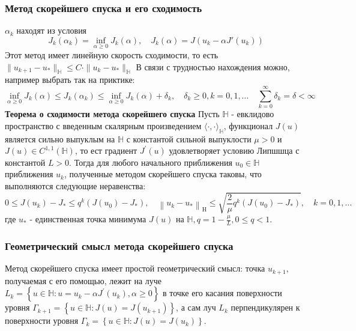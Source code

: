 \documentclass[A4]{article}
\begin{document}
\subsubsection{Метод скорейшего спуска и его сходимость}
$\alpha_k$ находят из условия 
\begin{equation*}
J_k(\alpha_k)=\inf_{\alpha\geqslant 0}J_k(\alpha),\quad J_k(\alpha)=J(u_k-\alpha J'(u_k))
\end{equation*}
Этот метод имеет линейную скорость сходимости, то есть $\|u_{k+1}-u_*\|_{\mathbb{H}} \leqslant C\cdot\|u_k-u_*\|_{\mathbb{H}}$
В связи с трудностью нахождения можно, например выбрать так на приктике:
\begin{equation*}
\inf_{\alpha\geqslant 0}J_k(\alpha)\leqslant J_k(\alpha_k)\leqslant \inf_{\alpha\geqslant 0}J_k(\alpha)+\delta_k,\quad \delta_k\geqslant 0,k=0,1,\ldots\quad \sum_{k=0}^{\infty}\delta_k=\delta<\infty
\end{equation*}
\textbf{Теорема о сходимости метода скорейшего спуска}  Пусть $\mathbb{H}$ -  евклидово пространство с введенным скалярным произведением $ \langle\cdot, \cdot\rangle_{\mathbb{H}}$, функционал $ J(u)$ является сильно выпуклым на $ \mathbb{H} $ с константой сильной выпуклости $ \mu>0 $ и $ J(u) \in C^{1,1}(\mathbb{H})$, то ест градиент $ J^{\prime}(u) $ удовлетворяет условию Липшшца с константой $ L>0$.  Тогда для любого начального приближения $ u_{0} \in \mathbb{H} $ приближения $ u_{k}$, полученные методом скорейшего спуска таковы, что выполняются следующие неравенства:
\begin{equation*}
0 \leqslant J\left(u_{k}\right)-J_{*} \leqslant q^{k}\left(J\left(u_{0}\right)-J_{*}\right), \quad\left\|u_{k}-u_{*}\right\|_{\mathrm{H}} \leqslant \sqrt{\frac{2}{\mu} q^{k}\left(J\left(u_{0}\right)-J_{*}\right)}, \quad k=0,1, \ldots
\end{equation*}
где $ u_{*}$ - единственная точка минимума $ J(u) $ на $ \mathbb{H}, q=1-\frac{\mu}{L}, 0 \leqslant q<1$.
\subsubsection{Геометрический смысл метода скорейшего спуска}
Метод скорейшего спуска имеет простой геометрический смысл: точка $ u_{k+1}$,  получаемая с его помощью, лежит на луче $ L_{k}=\left\{u \in \mathbb{H}: u=u_{k}-\alpha J^{\prime}\left(u_{k}\right), \alpha \geqslant 0\right\} $ в точке его касания поверхности уровня $ \Gamma_{k+1}=\left\{u \in \mathbb{H}: J(u)=J\left(u_{k+1}\right)\right\}$, а сам луч $ L_{k} $ перпендикулярен к поверхности уровня $ \Gamma_{k}=\left\{u \in \mathbb{H}: J(u)=J\left(u_{k}\right)\right\}$. 
\end{document}
